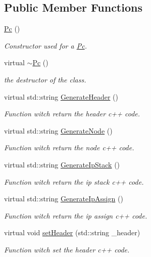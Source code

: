 \subsection*{Public Member Functions}
\begin{CompactItemize}
\item 
\hyperlink{class_pc_ef7314496cee3c1bd2c329aac4dc4f21}{Pc} ()
\begin{CompactList}\small\item\em Constructor used for a \hyperlink{class_pc}{Pc}. \item\end{CompactList}\item 
virtual \hyperlink{class_pc_b15cb9b9bfb8a9d9ff964091e1a63cec}{$\sim$Pc} ()
\begin{CompactList}\small\item\em the destructor of the class. \item\end{CompactList}\item 
virtual std::string \hyperlink{class_pc_0b152acc530cc73f502f046e19f9344f}{GenerateHeader} ()
\begin{CompactList}\small\item\em Function witch return the header c++ code. \item\end{CompactList}\item 
virtual std::string \hyperlink{class_pc_36ace04642cd481b39d312b51c37c114}{GenerateNode} ()
\begin{CompactList}\small\item\em Function witch return the node c++ code. \item\end{CompactList}\item 
virtual std::string \hyperlink{class_pc_6b81e7a8e167ed51f92ce55c0447fefe}{GenerateIpStack} ()
\begin{CompactList}\small\item\em Function witch return the ip stack c++ code. \item\end{CompactList}\item 
virtual std::string \hyperlink{class_pc_85794eaecd61612d44e1c68746e1c156}{GenerateIpAssign} ()
\begin{CompactList}\small\item\em Function witch return the ip assign c++ code. \item\end{CompactList}\item 
virtual void \hyperlink{class_pc_8049628cd139b39cbae2327e70ca0eb7}{setHeader} (std::string \_\-header)
\begin{CompactList}\small\item\em Function witch set the header c++ code. \item\end{CompactList}\end{CompactItemize}


